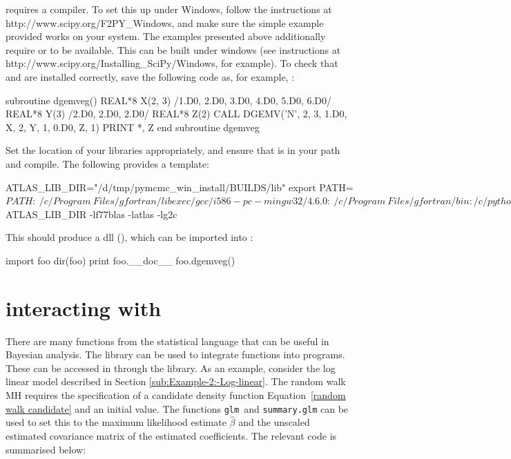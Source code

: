 \documentclass[article]{jss}
\begin{document}
 requires a  compiler. To set this up
under Windows, follow the instructions at
http://www.scipy.org/F2PY\_Windows, and make sure the simple example
provided works on your system. The examples presented above
additionally require  or \mbox{} to be available.
This can be built under windows (see instructions at \linebreak
http://www.scipy.org/Installing\_SciPy/Windows, for example). To check
that  and \mbox{} are installed correctly, save
the following code as, for example, :


\begin{Code}
subroutine dgemveg()
  REAL*8 X(2, 3) /1.D0, 2.D0, 3.D0, 4.D0, 5.D0, 6.D0/
  REAL*8 Y(3) /2.D0, 2.D0, 2.D0/
  REAL*8 Z(2)
  CALL DGEMV('N', 2, 3, 1.D0, X, 2, Y, 1, 0.D0, Z, 1)
  PRINT *, Z
end subroutine dgemveg
\end{Code}



Set the location of your  libraries appropriately, and ensure
that  is in your path and compile. The following provides a
template:


\begin{Code}
ATLAS_LIB_DIR="/d/tmp/pymcmc_win_install/BUILDS/lib"
export PATH=${PATH}:\
/c/Program\ Files/gfortran/libexec/gcc/i586-pc-mingw32/4.6.0:\
/c/Program\ Files/gfortran/bin:/c/python26 
python /c/Python26/Scripts/f2py.py -c -m foo \
   --fcompiler=gfortran \
   blas_eg.f90 -L${ATLAS_LIB_DIR} -lf77blas -latlas -lg2c 
\end{Code}


This should produce a  dll (\code{foo.pyd}), which can be imported
into \proglang{Python}:


\begin{Code}
import foo
dir(foo) 
print foo.__doc__
foo.dgemveg() 
\end{Code}

\section[PyMCMC interacting with R]{ 
interacting with }
\label{sec:PyMCMC-interacting-with}

There are many functions from the \proglang{R} statistical language
\citep{R} that can be useful in Bayesian analysis. The 
\citep{gautier:_rpy2}  library can be used to
integrate  functions into  programs. These can
be accessed in \pkg{PyMCMC} through the \pkg{RPy2} \proglang{Python}
library. As an example, consider the log linear model described in
Section \ref{sub:Example-2:-Log-linear}. The random walk MH requires
the specification of a candidate density function Equation~\ref{random
  walk candidate} and an initial value. The \proglang{R} functions
\texttt{glm }and \texttt{summary.glm} can be used to set this to the
maximum likelihood estimate $\hat{\beta}$ and the unscaled estimated
covariance matrix of the estimated coefficients. The relevant code is
summarised below:
\end{document}
